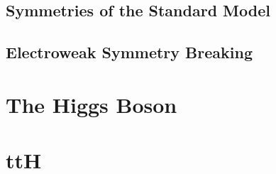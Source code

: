 \subsection{Symmetries of the Standard Model}
\subsection{Electroweak Symmetry Breaking}
\section{The Higgs Boson}

\section{ttH}


%
% 
% 
